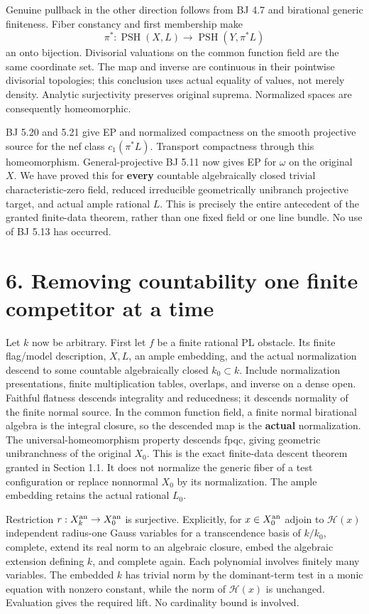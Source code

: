 \documentclass[
  10pt,
]{article}
\begin{document}
Genuine pullback in the other direction follows from BJ 4.7 and
birational generic finiteness. Fiber constancy and first membership make
\[\pi^*: \operatorname{PSH}(X,L)\longrightarrow\operatorname{PSH}(Y,\pi^*L)\]
an onto bijection. Divisorial valuations on the common function field
are the same coordinate set. The map and inverse are continuous in their
pointwise divisorial topologies; this conclusion uses actual equality of
values, not merely density. Analytic surjectivity preserves original
suprema. Normalized spaces are consequently homeomorphic.

BJ 5.20 and 5.21 give EP and normalized compactness on the smooth
projective source for the nef class \(c_1(\pi^*L)\). Transport
compactness through this homeomorphism. General-projective BJ 5.11 now
gives EP for \(\omega\) on the original \(X\). We have proved this for
\textbf{every} countable algebraically closed trivial
characteristic-zero field, reduced irreducible geometrically unibranch
projective target, and actual ample rational \(L\). This is precisely
the entire antecedent of the granted finite-data theorem, rather than
one fixed field or one line bundle. No use of BJ 5.13 has occurred.

\section{6. Removing countability one finite competitor at a
time}\label{removing-countability-one-finite-competitor-at-a-time}

Let \(k\) now be arbitrary. First let \(f\) be a finite rational PL
obstacle. Its finite flag/model description, \(X,L\), an ample
embedding, and the actual normalization descend to some countable
algebraically closed \(k_0\subset k\). Include normalization
presentations, finite multiplication tables, overlaps, and inverse on a
dense open. Faithful flatness descends integrality and reducedness; it
descends normality of the finite normal source. In the common function
field, a finite normal birational algebra is the integral closure, so
the descended map is the \textbf{actual} normalization. The
universal-homeomorphism property descends fpqc, giving geometric
unibranchness of the original \(X_0\). This is the exact finite-data
descent theorem granted in Section 1.1. It does not normalize the
generic fiber of a test configuration or replace nonnormal \(X_0\) by
its normalization. The ample embedding retains the actual rational
\(L_0\).

Restriction \(r:X_k^{\rm an}\to X_0^{\rm an}\) is surjective.
Explicitly, for \(x\in X_0^{\rm an}\) adjoin to \(\mathcal H(x)\)
independent radius-one Gauss variables for a transcendence basis of
\(k/k_0\), complete, extend its real norm to an algebraic closure, embed
the algebraic extension defining \(k\), and complete again. Each
polynomial involves finitely many variables. The embedded \(k\) has
trivial norm by the dominant-term test in a monic equation with nonzero
constant, while the norm of \(\mathcal H(x)\) is unchanged. Evaluation
gives the required lift. No cardinality bound is involved.
\end{document}
